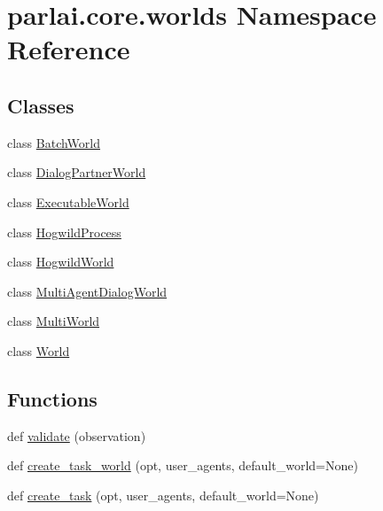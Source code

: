 \hypertarget{namespaceparlai_1_1core_1_1worlds}{}\section{parlai.\+core.\+worlds Namespace Reference}
\label{namespaceparlai_1_1core_1_1worlds}
\subsection*{Classes}
\begin{DoxyCompactItemize}
\item 
class \hyperlink{classparlai_1_1core_1_1worlds_1_1BatchWorld}{Batch\+World}
\item 
class \hyperlink{classparlai_1_1core_1_1worlds_1_1DialogPartnerWorld}{Dialog\+Partner\+World}
\item 
class \hyperlink{classparlai_1_1core_1_1worlds_1_1ExecutableWorld}{Executable\+World}
\item 
class \hyperlink{classparlai_1_1core_1_1worlds_1_1HogwildProcess}{Hogwild\+Process}
\item 
class \hyperlink{classparlai_1_1core_1_1worlds_1_1HogwildWorld}{Hogwild\+World}
\item 
class \hyperlink{classparlai_1_1core_1_1worlds_1_1MultiAgentDialogWorld}{Multi\+Agent\+Dialog\+World}
\item 
class \hyperlink{classparlai_1_1core_1_1worlds_1_1MultiWorld}{Multi\+World}
\item 
class \hyperlink{classparlai_1_1core_1_1worlds_1_1World}{World}
\end{DoxyCompactItemize}
\subsection*{Functions}
\begin{DoxyCompactItemize}
\item 
def \hyperlink{namespaceparlai_1_1core_1_1worlds_afc3fad603b7bce41dbdc9cdc04a9c794}{validate} (observation)
\item 
def \hyperlink{namespaceparlai_1_1core_1_1worlds_a055ee493c9ed03ecff4832f52b408f8c}{create\+\_\+task\+\_\+world} (opt, user\+\_\+agents, default\+\_\+world=None)
\item 
def \hyperlink{namespaceparlai_1_1core_1_1worlds_a11923c10b545c7ecc1b08fe2242d9c2c}{create\+\_\+task} (opt, user\+\_\+agents, default\+\_\+world=None)
\end{DoxyCompactItemize}


